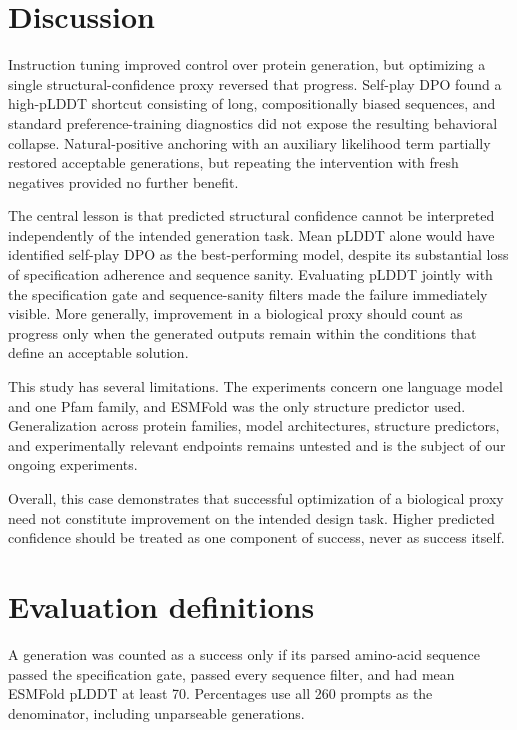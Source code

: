 \documentclass{article}
\begin{document}
\section{Discussion}
\label{sec:discussion}

Instruction tuning improved control over protein generation, but optimizing a
single structural-confidence proxy reversed that progress. Self-play DPO found
a high-pLDDT shortcut consisting of long, compositionally biased sequences,
and standard preference-training diagnostics did not expose the resulting
behavioral collapse. Natural-positive anchoring with an auxiliary likelihood
term partially restored acceptable generations, but repeating the intervention
with fresh negatives provided no further benefit.

The central lesson is that predicted structural confidence cannot be
interpreted independently of the intended generation task. Mean pLDDT alone
would have identified self-play DPO as the best-performing model, despite its
substantial loss of specification adherence and sequence sanity. Evaluating
pLDDT jointly with the specification gate and sequence-sanity filters made the
failure immediately visible. More generally, improvement in a biological proxy
should count as progress only when the generated outputs remain within the
conditions that define an acceptable solution.

This study has several limitations. The experiments concern one language model
and one Pfam family, and ESMFold was the only structure predictor used.
Generalization across protein families, model architectures, structure
predictors, and experimentally relevant endpoints remains untested and is the
subject of our ongoing experiments.

Overall, this case demonstrates that successful optimization of a biological proxy need not constitute improvement on the intended design task. Higher predicted confidence should be treated as one component of success, never as success itself.




\appendix
\setcounter{figure}{0}
\renewcommand{\thefigure}{A\arabic{figure}}
\section{Evaluation definitions}
\label{app:criteria}

A generation was counted as a success only if its parsed amino-acid sequence passed the specification gate, passed every sequence
filter, and had mean ESMFold pLDDT at least 70. Percentages use all 260 prompts
as the denominator, including unparseable generations.
\end{document}
